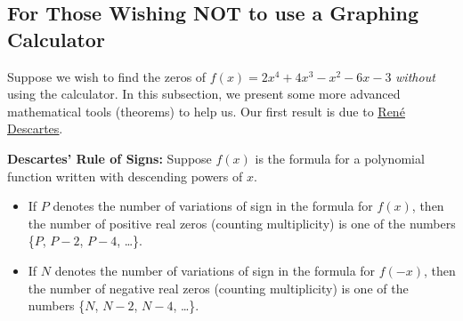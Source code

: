 \subsection{For Those Wishing NOT to use a Graphing Calculator}

Suppose we wish to find the zeros of $f(x) = 2x^4+4x^3-x^2-6x-3$ \textit{without} using the calculator.  In this subsection, we present some more advanced mathematical tools (theorems) to help us.  Our first result is due to \href{http://en.wikipedia.org/wiki/Descartes}{\underline{Ren\'{e} Descartes}}.

\smallskip

\colorbox{ResultColor}{\bbm

\begin{thm} \label{DRS}  \textbf{Descartes' Rule of Signs:}  Suppose $f(x)$ is the formula for a polynomial function written with descending powers of $x$.

\begin{itemize}

\item If $P$ denotes the number of variations of sign in the formula for $f(x)$, then the number of positive real zeros (counting multiplicity) is one of the numbers \{$P$, $P-2$, $P-4$, \ldots \}.

\item If $N$ denotes the number of variations of sign in the formula for $f(-x)$, then the number of negative real zeros (counting multiplicity) is one of the numbers \{$N$, $N-2$, $N-4$, \dots\}.

\end{itemize}

\end{thm}
\ebm}

\smallskip

